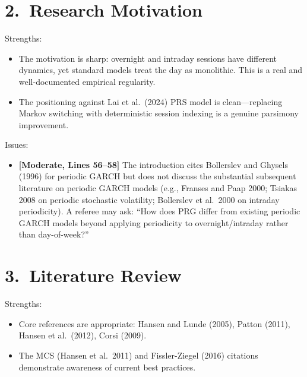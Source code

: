 \documentclass[12pt,a4paper]{article}
\begin{document}
\bigskip

\section*{2.\ Research Motivation}

\noindent \textcolor{okgreen}{Strengths:}
\begin{itemize}[nosep]
\item The motivation is sharp: overnight and intraday sessions have different dynamics, yet standard models treat the day as monolithic. This is a real and well-documented empirical regularity.
\item The positioning against Lai et al.\ (2024) PRS model is clean---replacing Markov switching with deterministic session indexing is a genuine parsimony improvement.
\end{itemize}

\noindent \textcolor{warncolor}{Issues:}
\begin{itemize}[nosep]
\item [\textcolor{warncolor}{M3}] \textbf{[Moderate, Lines 56--58]} The introduction cites Bollerslev and Ghysels (1996) for periodic GARCH but does not discuss the substantial subsequent literature on periodic GARCH models (e.g., Franses and Paap 2000; Tsiakas 2008 on periodic stochastic volatility; Bollerslev et al.\ 2000 on intraday periodicity). A referee may ask: ``How does PRG differ from existing periodic GARCH models beyond applying periodicity to overnight/intraday rather than day-of-week?''
\end{itemize}

\bigskip

\section*{3.\ Literature Review}

\noindent \textcolor{okgreen}{Strengths:}
\begin{itemize}[nosep]
\item Core references are appropriate: Hansen and Lunde (2005), Patton (2011), Hansen et al.\ (2012), Corsi (2009).
\item The MCS (Hansen et al.\ 2011) and Fissler-Ziegel (2016) citations demonstrate awareness of current best practices.
\end{itemize}
\end{document}
